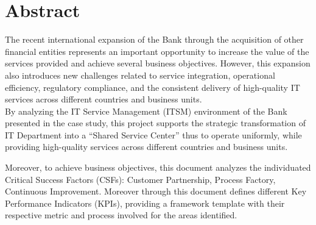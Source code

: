 \chapter*{Abstract}
\label{cap:abstract}

The recent international expansion of the Bank through the acquisition of other financial entities represents an important opportunity to increase the value of the services provided and achieve several business objectives. However, this expansion also introduces new challenges related to service integration, operational efficiency, regulatory compliance, and the consistent delivery of high-quality IT services across different countries and business units. \\

By analyzing the IT Service Management (ITSM) environment of the Bank presented in the case study, this project supports the strategic transformation of IT Department into a ``Shared Service Center'' thus to operate uniformly, while providing high-quality services across different countries and business units.

Moreover, to achieve business objectives, this document analyzes the individuated Critical Success Factors (CSFs): Customer Partnership, Process Factory, Continuous Improvement. 
Moreover through this document defines different Key Performance Indicators (KPIs), providing a framework template with their respective metric and process involved for the areas identified.